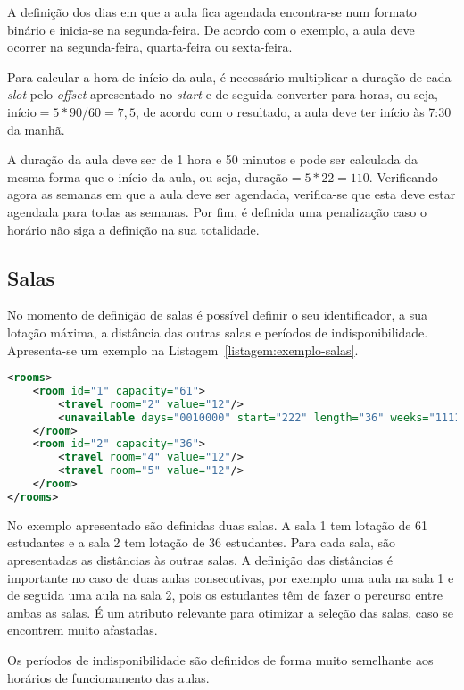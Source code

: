 A definição dos dias em que a aula fica agendada encontra-se num formato binário e inicia-se na segunda-feira. De acordo com o exemplo, a aula deve ocorrer na segunda-feira, quarta-feira ou sexta-feira.

Para calcular a hora de início da aula, é necessário multiplicar a duração de cada \textit{slot} pelo \textit{offset} apresentado no \textit{start} e de seguida converter para horas, ou seja, $\text{início} = 5*90/60 = 7,5$, de acordo com o resultado, a aula deve ter início às 7:30 da manhã.

A duração da aula deve ser de 1 hora e 50 minutos e pode ser calculada da mesma forma que o início da aula, ou seja, $\text{duração} = 5*22 = 110$. Verificando agora as semanas em que a aula deve ser agendada, verifica-se que esta deve estar agendada para todas as semanas. Por fim, é definida uma penalização caso o horário não siga a definição na sua totalidade.

\subsection{Salas}

No momento de definição de salas é possível definir o seu identificador, a sua lotação máxima, a distância das outras salas e períodos de indisponibilidade. Apresenta-se um exemplo na Listagem~\ref{listagem:exemplo-salas}.

\begin{lstlisting}[language=XML, float, caption={Exemplo da definição das salas.}, label={listagem:exemplo-salas}]
<rooms>
    <room id="1" capacity="61">
        <travel room="2" value="12"/>
        <unavailable days="0010000" start="222" length="36" weeks="111111111111111"/>
    </room>
    <room id="2" capacity="36">
        <travel room="4" value="12"/>
        <travel room="5" value="12"/>
    </room>
</rooms>
\end{lstlisting}

No exemplo apresentado são definidas duas salas. A sala 1 tem lotação de 61 estudantes e a sala 2 tem lotação de 36 estudantes. Para cada sala, são apresentadas as distâncias às outras salas. A definição das distâncias é importante no caso de duas aulas consecutivas, por exemplo uma aula na sala 1 e de seguida uma aula na sala 2, pois os estudantes têm de fazer o percurso entre ambas as salas. É um atributo relevante para otimizar a seleção das salas, caso se encontrem muito afastadas.

Os períodos de indisponibilidade são definidos de forma muito semelhante aos horários de funcionamento das aulas.

